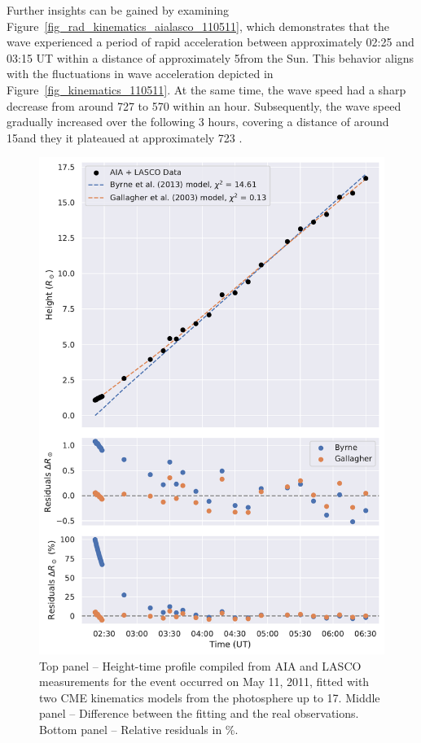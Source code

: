 Further insights can be gained by examining Figure~\ref{fig_rad_kinematics_aialasco_110511}, which demonstrates that the wave experienced a period of rapid acceleration between approximately 02:25 and 03:15 UT within a distance of approximately 5\rsun from the Sun. This behavior aligns with the fluctuations in wave acceleration depicted in Figure~\ref{fig_kinematics_110511}. At the same time, the wave speed had a sharp decrease from around 727 \kms to 570 \kms within an hour. Subsequently, the wave speed gradually increased over the following 3 hours, covering a distance of around 15\rsun and they it plateaued at approximately 723 \kms.

\begin{figure}[!htp] %
	\centerline{\includegraphics[width=0.7\columnwidth]{chapter2/figs/height_profile_residuals_aia_lasco_110511_01.pdf}}
	\caption{Top panel -- Height-time profile compiled from AIA and LASCO measurements for the event occurred on May 11, 2011, fitted with two CME kinematics models from the photosphere up to 17\rsun. Middle panel -- Difference between the fitting and the real observations. Bottom panel -- Relative residuals in \%.}
	\label{fig_height_profile_aialasco_110511}
\end{figure}

